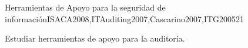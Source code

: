 \begin{syllabus}
\begin{unit}{Herramientas de Apoyo para la seguridad de información}{}{ISACA2008,ITAuditing2007,Cascarino2007,ITG2005}{2}{1}
    \begin{learningoutcomes}
    \item Estudiar herramientas de apoyo para la auditoría.
    \end{learningoutcomes}
    \end{unit}
    
    \begin{coursebibliography}
    \end{coursebibliography}
    
    \end{syllabus}
    